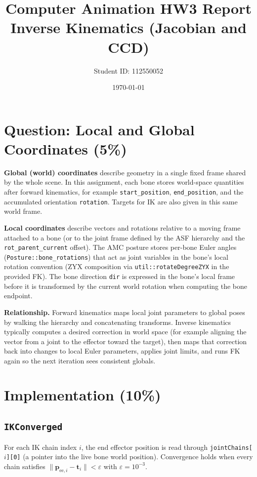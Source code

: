 \documentclass[11pt,a4paper]{article}
\title{Computer Animation HW3 Report\\Inverse Kinematics (Jacobian and CCD)}
\author{Student ID: 112550052}
\date{\today}
\begin{document}
\maketitle

\section{Question: Local and Global Coordinates (5\%)}

\textbf{Global (world) coordinates} describe geometry in a single fixed frame shared by the whole scene.
In this assignment, each bone stores world-space quantities after forward kinematics, for example
\texttt{start\_position}, \texttt{end\_position}, and the accumulated orientation \texttt{rotation}.
Targets for IK are also given in this same world frame.

\textbf{Local coordinates} describe vectors and rotations relative to a moving frame attached to a bone
(or to the joint frame defined by the ASF hierarchy and the \texttt{rot\_parent\_current} offset).
The AMC posture stores per-bone Euler angles (\texttt{Posture::bone\_rotations}) that act as joint variables
in the bone's local rotation convention (ZYX composition via \texttt{util::rotateDegreeZYX} in the provided FK).
The bone direction \texttt{dir} is expressed in the bone's local frame before it is transformed by the
current world rotation when computing the bone endpoint.

\textbf{Relationship.}
Forward kinematics maps local joint parameters to global poses by walking the hierarchy and concatenating
transforms. Inverse kinematics typically computes a desired correction in world space (for example aligning
the vector from a joint to the effector toward the target), then maps that correction back into changes to
local Euler parameters, applies joint limits, and runs FK again so the next iteration sees consistent globals.

\section{Implementation (10\%)}

\subsection{\texttt{IKConverged}}
For each IK chain index $i$, the end effector position is read through \texttt{jointChains[$i$][0]} (a pointer
into the live bone world position). Convergence holds when every chain satisfies
$\lVert \mathbf{p}_{\mathrm{ee},i}-\mathbf{t}_i\rVert < \varepsilon$ with $\varepsilon = 10^{-3}$.
\end{document}
